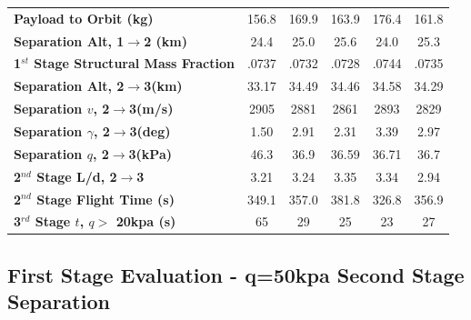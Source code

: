 \documentclass[journal]{new-aiaa}
\newcommand{\FirstStageAltConstq}{24.4}
\newcommand{\FirstStageAltFifty}{25.0}
\newcommand{\FirstStageAltFortyFive}{25.6}
\newcommand{\FirstStageAltFiftyFive}{24.0}
\newcommand{\FirstStageAltHighDrag}{25.3}
\newcommand{\FirstStagesmfConstq}{.0737}
\newcommand{\FirstStagesmfFifty}{.0732}
\newcommand{\FirstStagesmfFortyFive}{.0728}
\newcommand{\FirstStagesmfFiftyFive}{.0744}
\newcommand{\FirstStagesmfHighDrag}{.0735}
\newcommand{\PayloadToOrbitConstq}{156.8}
\newcommand{\PayloadToOrbitFiftykPa}{169.9}
\newcommand{\PayloadToOrbitFortyFivekPa}{163.9}
\newcommand{\PayloadToOrbitFiftyFivekPa}{176.4}
\newcommand{\PayloadToOrbitHighDrag}{161.8}
\newcommand{\SeparationAltConstq}{33.17}
\newcommand{\SeparationAltFiftykPa}{34.49}
\newcommand{\SeparationAltFortyFivekPa}{34.46}
\newcommand{\SeparationAltFiftyFivekPa}{34.58}
\newcommand{\SeparationAltHighDrag}{34.29}
\newcommand{\SeparationvConstq}{2905}
\newcommand{\SeparationvFiftykPa}{2881}
\newcommand{\SeparationvFortyFivekPa}{2861}
\newcommand{\SeparationvFiftyFivekPa}{2893}
\newcommand{\SeparationvHighDrag}{2829}
\newcommand{\SeparationAngleConstq}{1.50}
\newcommand{\SeparationAngleFiftykPa}{2.91}
\newcommand{\SeparationAngleFortyFivekPa}{2.31}
\newcommand{\SeparationAngleFiftyFivekPa}{3.39}
\newcommand{\SeparationAngleHighDrag}{2.97}
\newcommand{\SeparationqConstq}{46.3}
\newcommand{\SeparationqFiftykPa}{36.9}
\newcommand{\SeparationqFortyFivekPa}{36.59}
\newcommand{\SeparationqFiftyFivekPa}{36.71}
\newcommand{\SeparationqHighDrag}{36.7}
\newcommand{\SeparationLDConstq}{3.21}
\newcommand{\SeparationLDFiftykPa}{3.24}
\newcommand{\SeparationLDFortyFivekPa}{3.35}
\newcommand{\SeparationLDFiftyFivekPa}{3.34}
\newcommand{\SeparationLDHighDrag}{2.94}
\newcommand{\FlightTimeConstq}{349.1}
\newcommand{\FlightTimeFiftykPa}{357.0}
\newcommand{\FlightTimeFortyFivekPa}{381.8}
\newcommand{\FlightTimeFiftyFivekPa}{326.8}
\newcommand{\FlightTimeHighDrag}{356.9}
\newcommand{\toverConstq}{65}
\newcommand{\toverFiftykPa}{29}
\newcommand{\toverFortyFivekPa}{25}
\newcommand{\toverFiftyFivekPa}{23}
\newcommand{\toverHighDrag}{27}
\begin{document}
\begin{table}[htb]
\begin{tabular}{l c c c c c}
		\hline \textbf{Payload to Orbit (kg)}  & \PayloadToOrbitConstq & \PayloadToOrbitFiftykPa & \PayloadToOrbitFortyFivekPa & \PayloadToOrbitFiftyFivekPa & \PayloadToOrbitHighDrag \\ 
		\textbf{Separation Alt, 1$\rightarrow$2 (km)}  & \FirstStageAltConstq & \FirstStageAltFifty & \FirstStageAltFortyFive &  \FirstStageAltFiftyFive &\FirstStageAltHighDrag \\ 
		\textbf{1$^{st}$ Stage Structural Mass Fraction} & \FirstStagesmfConstq & \FirstStagesmfFifty &  \FirstStagesmfFortyFive& \FirstStagesmfFiftyFive  & \FirstStagesmfHighDrag\\ 
		 \textbf{Separation Alt, 2$\rightarrow$3(km)}  & \SeparationAltConstq & \SeparationAltFiftykPa & \SeparationAltFortyFivekPa & \SeparationAltFiftyFivekPa & \SeparationAltHighDrag\\ 
		 \textbf{Separation $v$, 2$\rightarrow$3(m/s)} & \SeparationvConstq  & \SeparationvFiftykPa & \SeparationvFortyFivekPa &  \SeparationvFiftyFivekPa & \SeparationvHighDrag\\ 
		 \textbf{Separation $\gamma$, 2$\rightarrow$3(deg)} & \SeparationAngleConstq& \SeparationAngleFiftykPa &\SeparationAngleFortyFivekPa& \SeparationAngleFiftyFivekPa&\SeparationAngleHighDrag \\ 
		 \textbf{Separation $q$, 2$\rightarrow$3(kPa)} & \SeparationqConstq  &\SeparationqFiftykPa&\SeparationqFortyFivekPa &\SeparationqFiftyFivekPa& \SeparationqHighDrag \\ 
		 \textbf{2$^{nd}$ Stage L/d, 2$\rightarrow$3} & \SeparationLDConstq&\SeparationLDFiftykPa & \SeparationLDFortyFivekPa & \SeparationLDFiftyFivekPa &\SeparationLDHighDrag\\
		 \textbf{2$^{nd}$ Stage Flight Time (s)} & \FlightTimeConstq & \FlightTimeFiftykPa & \FlightTimeFortyFivekPa & \FlightTimeFiftyFivekPa & \FlightTimeHighDrag\\ 
		 \textbf{3$^{rd}$ Stage $t$, $q >$ 20kpa (s)} &\toverConstq &\toverFiftykPa &\toverFortyFivekPa &\toverFiftyFivekPa & \toverHighDrag\\ 

		 
		\hline 
	\end{tabular} 


	\label{table:Summary}
\end{table}


\subsection{First Stage Evaluation - q=50kpa Second Stage Separation}
\end{document}
